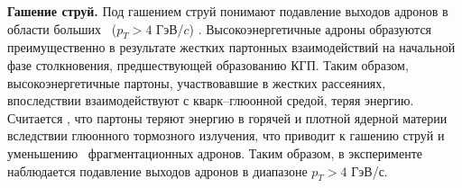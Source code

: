 \begin{comment}
	\begin{figure}[] 
		\center
		\includegraphics [width = 0,5\linewidth] {Intro/Strangeness_enhancement.png}
		\caption{Механизм образования странных кварков, основанный на модели термальной КХД.}
		\label{img:StrangenessEnhancement}  
	\end{figure}
\end{comment}
\begin{comment}
	\textbf{Динамика столкновения и уравнение состояния}
	Ожидается, что изучение коллективного движения образовавшихся адронов в конечном состоянии даст информацию о динамике столкновений тяжелых ионов. С гидродинамической точки зрения на столкновения,
	коллективное движение определяется градиентом давления сжатой ядерной материи на ранней стадии столкновения. В случае фазового перехода от порядковой ядерной к кварк-глюонной плазме ожидается соответствующее смягчение уравнения состояния за счет увеличения числа степеней свободы [4]. Таким образом, наблюдение за коллективным движением крайне важно для подтверждения гидродинамического описания динамики. Если фазовый переход первого рода, то уравнение состояния будет наиболее «мягким» при критической температуре Tc. Ожидается, что такое смягчение повлияет на динамическую эволюцию системы, поскольку внутреннее давление падает при Tc. Таким образом, наблюдение за функцией возбуждения поперечного коллективного потока может служить зондом для формирования КГП; падение функции возбуждения коллективного потока свидетельствует о пороговой энергии образования КГП.
\end{comment}

\textbf{Гашение струй.} 
Под гашением струй понимают подавление выходов адронов в области больших \pt \ ($p_T>4$ ГэВ/$c$) \cite{jet_quenching}. Высокоэнергетичные адроны образуются преимущественно в результате жестких партонных взаимодействий на начальной фазе столкновения, предшествующей образованию КГП. Таким образом, высокоэнергетичные партоны, участвовавшие в жестких рассеяниях, впоследствии взаимодействуют с кварк–глюонной средой, теряя энергию. Считается \cite{jet_quenching,InitialEnergyLoss}, что партоны теряют энергию в горячей и плотной ядерной материи вследствии глюонного тормозного излучения, что приводит к гашению струй и уменьшению \pt \ фрагментационных адронов.  Таким образом, в эксперименте наблюдается подавление выходов адронов в диапазоне $p_T > $4 ГэВ/с. 

